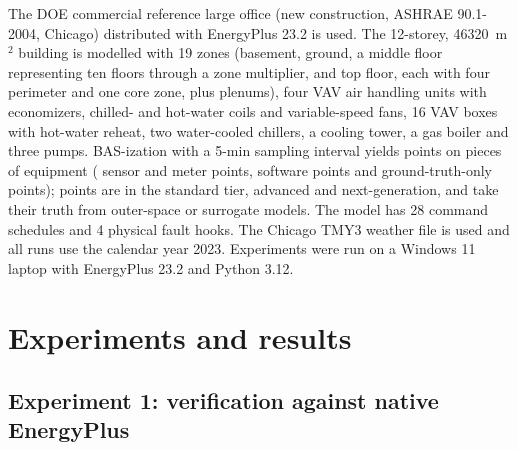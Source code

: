 \documentclass[preprint,12pt,authoryear=false]{elsarticle}
\begin{document}
The DOE commercial reference large office (new construction, ASHRAE 90.1-2004, Chicago) \cite{deru2011reference}
distributed with EnergyPlus 23.2 is used. The 12-storey, \num{46320}~m$^2$ building is modelled with 19 zones
(basement, ground, a middle floor representing ten floors through a zone multiplier, and top floor, each with four
perimeter and one core zone, plus plenums), four VAV air handling units with economizers, chilled- and hot-water coils
and variable-speed fans, 16 VAV boxes with hot-water reheat, two water-cooled chillers, a cooling tower, a gas boiler
and three pumps. BAS-ization with a 5-min sampling interval yields \NumPoints{} points on \NumEquip{} pieces of
equipment (\NumSensorPts{} sensor and meter points, \NumSoftPts{} software points and \NumTruthPts{} ground-truth-only
points); \NumStdPts{} points are in the standard tier, \NumAdvPts{} advanced and \NumNextPts{} next-generation, and
\NumModelPts{} take their truth from outer-space or surrogate models. The model has 28 command schedules and 4
physical fault hooks. The Chicago TMY3 weather file is used and all runs use the
calendar year 2023. Experiments were run on a Windows 11 laptop with EnergyPlus 23.2 and Python 3.12.

\section{Experiments and results}
\label{sec:results}

\subsection{Experiment 1: verification against native EnergyPlus}
\end{document}
